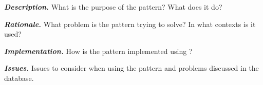 {

\noindent \textbf{\em Description.}
{What is the purpose of the pattern? What does it do?}

\noindent \textbf{\em Rationale.}
{What problem is the pattern trying to solve? In what contexts is it used?}


\noindent \textbf{\em Implementation.}
{How is the pattern implemented using \smu{}?}




\noindent \textbf{\em Issues.}
{Issues to consider when using the pattern and problems discussed in the
\stackoverflow{} database.}



}




